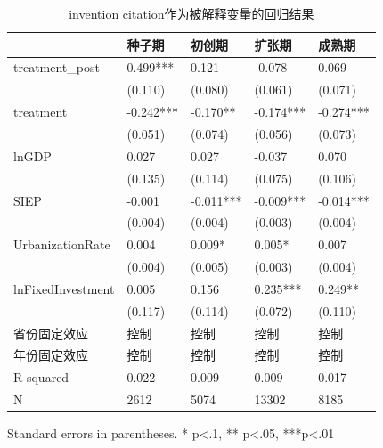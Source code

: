 \begin{table}
\caption{invention citation作为被解释变量的回归结果}
\label{}
\begin{center}
\begin{tabular}{lllll}
\hline
                  & 种子期       & 初创期       & 扩张期       & 成熟期        \\
\hline
treatment\_post   & 0.499***  & 0.121     & -0.078    & 0.069      \\
                  & (0.110)   & (0.080)   & (0.061)   & (0.071)    \\
treatment         & -0.242*** & -0.170**  & -0.174*** & -0.274***  \\
                  & (0.051)   & (0.074)   & (0.056)   & (0.073)    \\
lnGDP             & 0.027     & 0.027     & -0.037    & 0.070      \\
                  & (0.135)   & (0.114)   & (0.075)   & (0.106)    \\
SIEP            & -0.001    & -0.011*** & -0.009*** & -0.014***  \\
                  & (0.004)   & (0.004)   & (0.003)   & (0.004)    \\
UrbanizationRate              & 0.004     & 0.009*    & 0.005*    & 0.007      \\
                  & (0.004)   & (0.005)   & (0.003)   & (0.004)    \\
lnFixedInvestment & 0.005     & 0.156     & 0.235***  & 0.249**    \\
                  & (0.117)   & (0.114)   & (0.072)   & (0.110)    \\
省份固定效应  & 控制 & 控制 & 控制 & 控制  \\ 
 年份固定效应  & 控制 & 控制 & 控制 & 控制  \\ 
\hline

R-squared         & 0.022     & 0.009     & 0.009     & 0.017      \\
N                 & 2612      & 5074      & 13302     & 8185       \\
\hline
\end{tabular}
\end{center}
\end{table}
\bigskip
Standard errors in parentheses. \newline 
* p<.1, ** p<.05, ***p<.01

